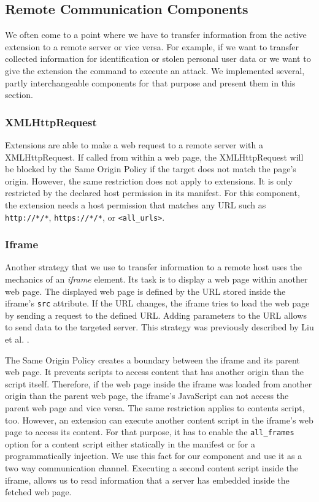 \subsection{Remote Communication Components}
\label{sec:remoteCommunication}

	We often come to a point where we have to transfer information from the active extension to a remote server or vice versa. For example, if we want to transfer collected information for identification or stolen personal user data or we want to give the extension the command to execute an attack. We implemented several, partly interchangeable components for that purpose and present them in this section.

\subsubsection{XMLHttpRequest}
\label{sec:xhrCommunication}

	Extensions are able to make a web request to a remote server with a XMLHttpRequest. If called from within a web page, the XMLHttpRequest will be blocked by the Same Origin Policy if the target does not match the page's origin. However, the same restriction does not apply to extensions. It is only restricted by the declared host permission in its manifest. For this component, the extension needs a host permission that matches any URL such as \texttt{http://*/*}, \texttt{https://*/*}, or \texttt{<all\_urls>}. 

\subsubsection{Iframe}
\label{sec:iframeCommunication}

	Another strategy that we use to transfer information to a remote host uses the mechanics of an \textit{iframe} element. Its task is to display a web page within another web page. The displayed web page is defined by the URL stored inside the iframe's \texttt{src} attribute. If the URL changes, the iframe tries to load the web page by sending a request to the defined URL. Adding parameters to the URL allows to send data to the targeted server. This strategy was previously described by Liu et al. \cite{Liu12chromeextensions:}.

	The Same Origin Policy creates a boundary between the iframe and its parent web page. It prevents scripts to access content that has another origin than the script itself. Therefore, if the web page inside the iframe was loaded from another origin than the parent web page, the iframe's JavaScript can not access the parent web page and vice versa. The same restriction applies to contents script, too. However, an extension can execute another content script in the iframe's web page to access its content. For that purpose, it has to enable the \texttt{all\_frames} option for a content script either statically in the manifest or for a programmatically injection. We use this fact for our component and use it as a two way communication channel. Executing a second content script inside the iframe, allows us to read information that a server has embedded inside the fetched web page.

